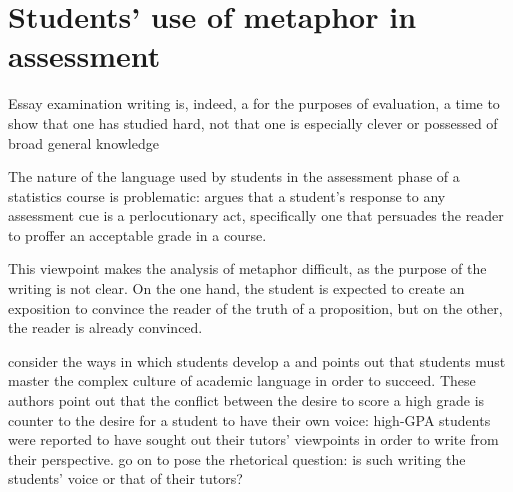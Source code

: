 %
%
%


\section{Students' use of metaphor in assessment}

\begin{singlespace}
\epigraph{Essay examination writing is, indeed, a  for
  the purposes of evaluation, a time to show that one has studied
  hard, not that one is especially clever or possessed of broad
  general knowledge}{}
\end{singlespace}

\noindent
The nature of the language used by students in the assessment phase of
a statistics course is problematic:  argues that a
student's response to any assessment cue is a perlocutionary act,
specifically one that persuades the reader to proffer an acceptable
grade in a course.

This viewpoint makes the analysis of metaphor difficult, as the
purpose of the writing is not clear.  On the one hand, the student is
expected to create an exposition to convince the reader of the truth
of a proposition, but on the other, the reader is already convinced.

 consider the ways in which students develop a
 and points out that students must master the complex
culture of academic language in order to succeed.  These authors point
out that the conflict between the desire to score a high grade is
counter to the desire for a student to have their own voice: high-GPA
students were reported to have sought out their tutors' viewpoints in
order to write from their perspective.   go on to pose
the rhetorical question: is such writing the students' voice or that
of their tutors?  

